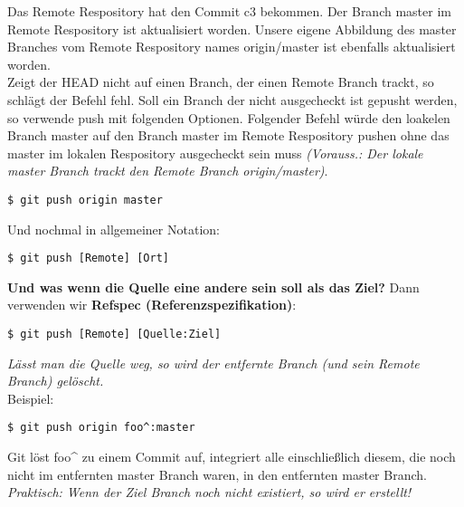 \documentclass[a4paper,8pt,landscape,twocolumn]{scrartcl}
\begin{document}
\begin{orangeBox}
Das Remote Respository hat den Commit c3 bekommen. Der Branch master im Remote Respository ist aktualisiert worden. Unsere eigene Abbildung des master Branches vom Remote Respository names origin/master ist ebenfalls aktualisiert worden.\\
Zeigt der HEAD nicht auf einen Branch, der einen Remote Branch trackt, so schlägt der Befehl fehl. Soll ein Branch der nicht ausgecheckt ist gepusht werden, so verwende push mit folgenden Optionen. Folgender Befehl würde den loakelen Branch master auf den Branch master im Remote Respository pushen ohne das master im lokalen Respository ausgecheckt sein muss \textit{(Vorauss.: Der lokale master Branch trackt den Remote Branch origin/master)}.
\begin{lstlisting}[style=bash]
$ git push origin master
\end{lstlisting}
Und nochmal in allgemeiner Notation:
\begin{lstlisting}[style=bash]
$ git push [Remote] [Ort]
\end{lstlisting}
\textbf{Und was wenn die Quelle eine andere sein soll als das Ziel?} Dann verwenden wir \textbf{Refspec (Referenzspezifikation)}:
\begin{lstlisting}[style=bash]
$ git push [Remote] [Quelle:Ziel]
\end{lstlisting}
\textit{Lässt man die Quelle weg, so wird der entfernte Branch (und sein Remote Branch) gelöscht.}\\
Beispiel:
\begin{lstlisting}[style=bash]
$ git push origin foo^:master
\end{lstlisting}
Git löst foo\^{} zu einem Commit auf, integriert alle einschließlich diesem, die noch nicht im entfernten master Branch waren, in den entfernten master Branch. \textit{Praktisch: Wenn der Ziel Branch noch nicht existiert, so wird er erstellt!}
\end{orangeBox}
\end{document}
